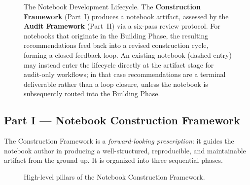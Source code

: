 \documentclass[11pt, a4paper]{article}
\begin{document}
\begin{figure}[ht]
	
	\caption{%
	The Notebook Development Lifecycle. The \textbf{Construction Framework}
	(Part~I) produces a notebook artifact, assessed by the
	\textbf{Audit Framework} (Part~II) via a six-pass review protocol.
	For notebooks that originate in the Building Phase, the resulting
	recommendations feed back into a revised construction cycle, forming
	a closed feedback loop. An existing notebook (dashed entry) may
	instead enter the lifecycle directly at the artifact stage for
	audit-only workflows; in that case recommendations are a terminal
	deliverable rather than a loop closure, unless the notebook is
	subsequently routed into the Building Phase.
	}
	\label{fig:notebook-lifecycle}
\end{figure}

\subsection*{Part I — Notebook Construction Framework}

The Construction Framework is a \textit{forward-looking prescription}:
it guides the notebook author in producing a well-structured, reproducible,
and maintainable artifact from the ground up. It is organized into three
sequential phases.

\begin{figure}[ht]
	\centering
	\caption{High-level pillars of the Notebook Construction Framework.}
	\label{fig:construction-tree}
\end{figure}
\end{document}
